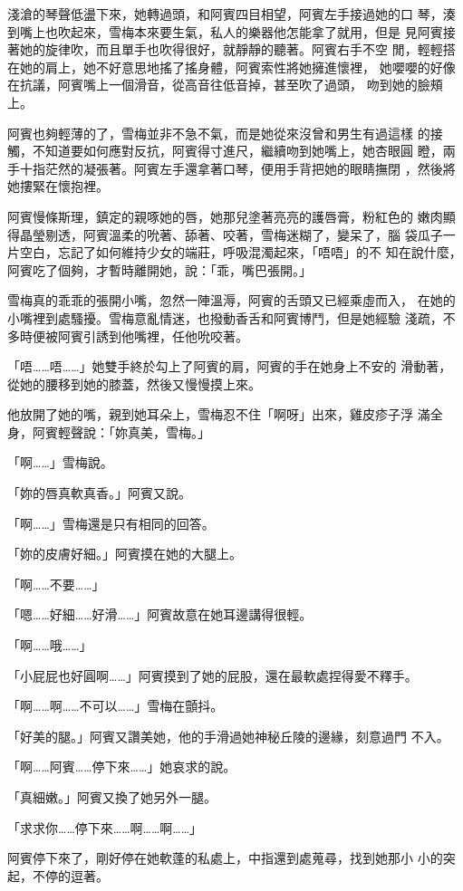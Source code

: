 淺滄的琴聲低盪下來，她轉過頭，和阿賓四目相望，阿賓左手接過她的口
琴，湊到嘴上也吹起來，雪梅本來要生氣，私人的樂器他怎能拿了就用，但是
見阿賓接著她的旋律吹，而且單手也吹得很好，就靜靜的聽著。阿賓右手不空
閒，輕輕搭在她的肩上，她不好意思地搖了搖身體，阿賓索性將她擁進懷裡，
她嚶嚶的好像在抗議，阿賓嘴上一個滑音，從高音往低音掉，甚至吹了過頭，
吻到她的臉頰上。

阿賓也夠輕薄的了，雪梅並非不急不氣，而是她從來沒曾和男生有過這樣
的接觸，不知道要如何應對反抗，阿賓得寸進尺，繼續吻到她嘴上，她杏眼圓
瞪，兩手十指茫然的凝張著。阿賓左手還拿著口琴，便用手背把她的眼睛撫閉
，然後將她摟緊在懷抱裡。

阿賓慢條斯理，鎮定的親啄她的唇，她那兒塗著亮亮的護唇膏，粉紅色的
嫩肉顯得晶瑩剔透，阿賓溫柔的吮著、舔著、咬著，雪梅迷糊了，變呆了，腦
袋瓜子一片空白，忘記了如何維持少女的端莊，呼吸混濁起來，「唔唔」的不
知在說什麼，阿賓吃了個夠，才暫時離開她，說：「乖，嘴巴張開。」

雪梅真的乖乖的張開小嘴，忽然一陣溫溽，阿賓的舌頭又已經乘虛而入，
在她的小嘴裡到處騷擾。雪梅意亂情迷，也撥動香舌和阿賓博鬥，但是她經驗
淺疏，不多時便被阿賓引誘到他嘴裡，任他吮咬著。

「唔……唔……」她雙手終於勾上了阿賓的肩，阿賓的手在她身上不安的
滑動著，從她的腰移到她的膝蓋，然後又慢慢摸上來。

他放開了她的嘴，親到她耳朵上，雪梅忍不住「啊呀」出來，雞皮疹子浮
滿全身，阿賓輕聲說：「妳真美，雪梅。」

「啊……」雪梅說。

「妳的唇真軟真香。」阿賓又說。

「啊……」雪梅還是只有相同的回答。

「妳的皮膚好細。」阿賓摸在她的大腿上。

「啊……不要……」

「嗯……好細……好滑……」阿賓故意在她耳邊講得很輕。

「啊……哦……」

「小屁屁也好圓啊……」阿賓摸到了她的屁股，還在最軟處捏得愛不釋手。

「啊……啊……不可以……」雪梅在顫抖。

「好美的腿。」阿賓又讚美她，他的手滑過她神秘丘陵的邊緣，刻意過門
不入。

「啊……阿賓……停下來……」她哀求的說。

「真細嫩。」阿賓又換了她另外一腿。

「求求你……停下來……啊……啊……」

阿賓停下來了，剛好停在她軟蓬的私處上，中指還到處蒐尋，找到她那小
小的突起，不停的逗著。

